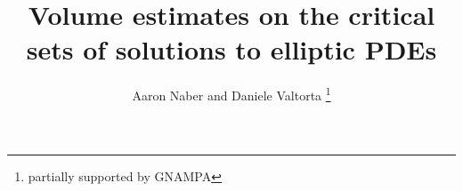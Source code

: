 \documentclass[11pt]{article}
\begin{document}
\newtheorem{theorem}{Theorem}[section]
\newtheorem*{theorem*}{Theorem}
\newtheorem{ctheorem}[theorem]{Conjectural Theorem}

\newtheorem{proposition}[theorem]{Proposition}

\newtheorem{lemma}[theorem]{Lemma}
\newtheorem{clemma}[theorem]{Conjectural Lemma}

\newtheorem{corollary}[theorem]{Corollary}

\theoremstyle{definition}
\newtheorem{definition}[theorem]{Definition}

\theoremstyle{remark}
\newtheorem{remark}[theorem]{Remark}

\theoremstyle{remark}
\newtheorem{example}[theorem]{Example}

\theoremstyle{remark}
\newtheorem{note}[theorem]{Note}

\theoremstyle{definition}
\newtheorem{notation}[theorem]{Notation}

\theoremstyle{remark}
\newtheorem{question}[theorem]{Question}

\theoremstyle{remark}
\newtheorem{conjecture}[theorem]{Conjecture}

\title{Volume estimates on the critical sets of solutions to elliptic PDEs}

\author{Aaron Naber and Daniele Valtorta \footnote{partially supported by GNAMPA}}
\end{document}
